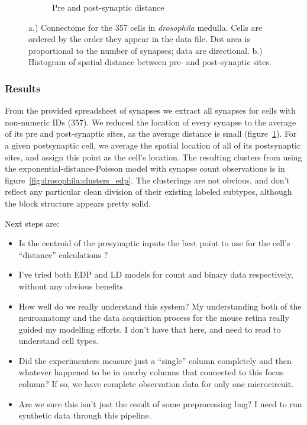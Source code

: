 \documentclass{article}
\begin{document}
\begin{figure}
\begin{subfigure}[b]{0.4\textwidth}
    \caption{Pre and post-synaptic distance}
    \label{fig:drosophila:distprepost}
  \end{subfigure}
  \caption{a.) Connectome for the 357 cells in \textit{drosophila} medulla. Cells are ordered by the order they appear in the data file. Dot area is proportional to the number of synapses; data are directional. b.) Histogram of spatial distance between pre- and post-synaptic sites.}
  \label{fig:drosophila_adj}
\end{figure}

\subsubsection{Results}

From the provided spreadsheet of synapses we extract all synapses for cells with non-numeric IDs (357). We reduced the location of every synapse to the average of its pre and post-synaptic sites, as the average distance is small (figure~\ref{fig:drosophila:distprepost}). For a given postsynaptic cell, we average the spatial location of all of its postsynaptic sites, and assign this point as the cell's location. The resulting clusters from using the exponential-distance-Poisson model with synapse count observations is in figure~\ref{fig:drosophila:clusters_edp}. The clusterings are not obvious, and don't reflect any particular clean division of their existing labeled subtypes, although the block structure appears pretty solid. 

Next steps are:

\begin{itemize}
  \item Is the centroid of the presynaptic inputs the best point to use for the cell's ``distance'' calculations ? 
  \item I've tried both EDP and LD models for count and binary data respectively, without any obvious benefits
  \item How well do we really understand this system? My understanding both of the neuroanatomy and the data acquisition process for the mouse retina really guided my modelling efforts. I don't have that here, and need to read \autocite{Fischbach1989} to understand cell types. 
  \item Did the experimenters measure just a ``single'' column completely and then whatever happened to be in nearby columns that connected to this focus column? If so, we have complete observation data for only one microcircuit. 
    \item Are we sure this isn't just the result of some preprocessing bug? I need to run synthetic data through this pipeline. 
      
    \end{itemize}
    
\end{document}
